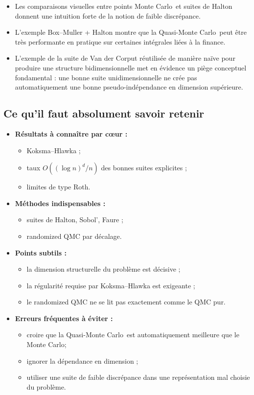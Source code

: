 \documentclass[11pt,a4paper]{article}
\newcommand{\mc}{Monte Carlo}
\newcommand{\qmc}{Quasi-Monte Carlo}
\begin{document}
\begin{itemize}
  \item Les comparaisons visuelles entre points \mc\ et suites de Halton donnent une intuition forte de la notion de faible discrépance.
  \item L'exemple Box--Muller + Halton montre que la \qmc\ peut être très performante en pratique sur certaines intégrales liées à la finance.
  \item L'exemple de la suite de Van der Corput réutilisée de manière naïve pour produire une structure bidimensionnelle met en évidence un piège conceptuel fondamental : une bonne suite unidimensionnelle ne crée pas automatiquement une bonne pseudo-indépendance en dimension supérieure.
\end{itemize}

\subsection{Ce qu'il faut absolument savoir retenir}

\begin{itemize}
  \item \textbf{Résultats à connaître par cœur :}
  \begin{itemize}
    \item Koksma--Hlawka ;
    \item taux $O((\log n)^d/n)$ des bonnes suites explicites ;
    \item limites de type Roth.
  \end{itemize}
  \item \textbf{Méthodes indispensables :}
  \begin{itemize}
    \item suites de Halton, Sobol', Faure ;
    \item randomized QMC par décalage.
  \end{itemize}
  \item \textbf{Points subtils :}
  \begin{itemize}
    \item la dimension structurelle du problème est décisive ;
    \item la régularité requise par Koksma--Hlawka est exigeante ;
    \item le randomized QMC ne se lit pas exactement comme le QMC pur.
  \end{itemize}
  \item \textbf{Erreurs fréquentes à éviter :}
  \begin{itemize}
    \item croire que la \qmc\ est automatiquement meilleure que le \mc ;
    \item ignorer la dépendance en dimension ;
    \item utiliser une suite de faible discrépance dans une représentation mal choisie du problème.
  \end{itemize}
\end{itemize}
\end{document}
